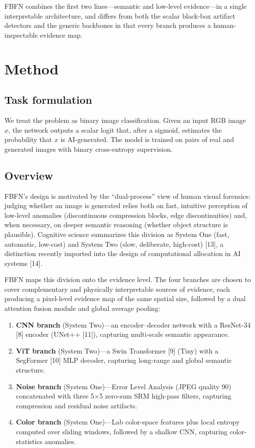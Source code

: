 \documentclass[11pt,a4paper]{article}
\begin{document}
FBFN combines the first two lines---semantic and low-level evidence---in a single interpretable architecture, and differs from both the scalar black-box artifact detectors and the generic backbones in that every branch produces a human-inspectable evidence map.

\section{Method}

\subsection{Task formulation}

We treat the problem as binary image classification. Given an input RGB image $x$, the network outputs a scalar logit that, after a sigmoid, estimates the probability that $x$ is AI-generated. The model is trained on pairs of real and generated images with binary cross-entropy supervision.

\subsection{Overview}

FBFN's design is motivated by the ``dual-process'' view of human visual forensics: judging whether an image is generated relies both on fast, intuitive perception of low-level anomalies (discontinuous compression blocks, edge discontinuities) and, when necessary, on deeper semantic reasoning (whether object structure is plausible). Cognitive science summarizes this division as System One (fast, automatic, low-cost) and System Two (slow, deliberate, high-cost) [13], a distinction recently imported into the design of computational allocation in AI systems [14].

FBFN maps this division onto the evidence level. The four branches are chosen to cover complementary and physically interpretable sources of evidence, each producing a pixel-level evidence map of the same spatial size, followed by a dual attention fusion module and global average pooling:

\begin{enumerate}
\item \textbf{CNN branch} (System Two)---an encoder--decoder network with a ResNet-34 [8] encoder (UNet++ [11]), capturing multi-scale semantic appearance.
\item \textbf{ViT branch} (System Two)---a Swin Transformer [9] (Tiny) with a SegFormer [10] MLP decoder, capturing long-range and global semantic structure.
\item \textbf{Noise branch} (System One)---Error Level Analysis (JPEG quality 90) concatenated with three 5$\times$5 zero-sum SRM high-pass filters, capturing compression and residual noise artifacts.
\item \textbf{Color branch} (System One)---Lab color-space features plus local entropy computed over sliding windows, followed by a shallow CNN, capturing color-statistics anomalies.
\end{enumerate}
\end{document}
